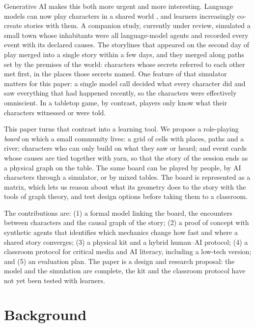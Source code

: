 \documentclass[12pt]{article}
\begin{document}
Generative AI makes this both more urgent and more interesting. Language
models can now play characters in a shared world
\parencite{park2023,callisonburch2022}, and learners increasingly co-create
stories with them. A companion study, currently under review, simulated a
small town whose inhabitants were all language-model agents and recorded
every event with its declared causes. The storylines that appeared on the
second day of play merged into a single story within a few days, and they
merged along paths set by the premises of the world: characters whose
secrets referred to each other met first, in the places those secrets
named. One feature of that simulator matters for this paper: a single model
call decided what every character did and saw everything that had happened
recently, so the characters were effectively omniscient. In a tabletop game,
by contrast, players only know what their characters witnessed or were told.

This paper turns that contrast into a learning tool. We propose a
role-playing \emph{board} on which a small community lives: a grid of cells
with places, paths and a river; characters who can only build on what they
saw or heard; and event cards whose causes are tied together with yarn, so
that the story of the session ends as a physical graph on the table. The
same board can be played by people, by AI characters through a simulator,
or by mixed tables. The board is represented as a matrix, which lets us
reason about what its geometry does to the story with the tools of graph
theory, and test design options before taking them to a classroom.

The contributions are: (1) a formal model linking the board, the encounters
between characters and the causal graph of the story; (2) a proof of
concept with synthetic agents that identifies which mechanics change how
fast and where a shared story converges; (3) a physical kit and a hybrid
human--AI protocol; (4) a classroom protocol for critical media and AI
literacy, including a low-tech version; and (5) an evaluation plan. The
paper is a design and research proposal: the model and the simulation are
complete, the kit and the classroom protocol have not yet been tested with
learners.

\section{Background}
\end{document}
